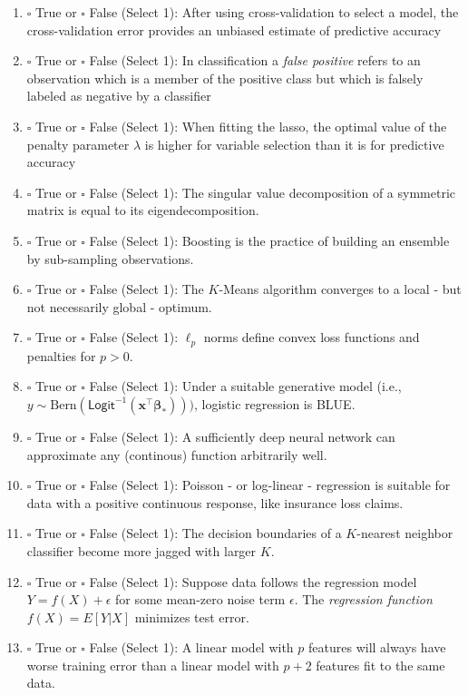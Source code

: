 \documentclass[12pt]{article}
\newcommand{\bx}{\bm{x}}
\newcommand{\bbeta}{\bm{\beta}}
\begin{document}
\begin{enumerate}[label={\bf MC\arabic*.)}]
\item $\square$ True or $\square$ False (Select 1): After using cross-validation to select a model, the cross-validation error provides an unbiased estimate of predictive accuracy
\item $\square$ True or $\square$ False (Select 1): In classification a \emph{false positive} refers to an observation which is a member of the positive class but which is falsely labeled as negative by a classifier
\item $\square$ True or $\square$ False (Select 1): When fitting the lasso, the optimal value of the penalty parameter $\lambda$ is higher for variable selection than it is for predictive accuracy
\item $\square$ True or $\square$ False (Select 1): The singular value decomposition of a symmetric matrix is equal to its eigendecomposition.
\item $\square$ True or $\square$ False (Select 1): Boosting is the practice of building an ensemble by sub-sampling observations. 
\item $\square$ True or $\square$ False (Select 1): The $K$-Means algorithm converges to a local - but not necessarily global - optimum. 
\item $\square$ True or $\square$ False (Select 1): $\ell_p$ norms define convex loss functions and penalties for $p > 0$.
\item $\square$ True or $\square$ False (Select 1): Under a suitable generative model (i.e., $y \sim \text{Bern}(\textsf{Logit}^{-1}(\bx^{\top}\bbeta_*)))$, logistic regression is BLUE. 
\item $\square$ True or $\square$ False (Select 1): A sufficiently deep neural network can approximate any (continous) function arbitrarily well.
\item $\square$ True or $\square$ False (Select 1): Poisson - or log-linear - regression is suitable for data with a positive continuous response, like insurance loss claims.
\item $\square$ True or $\square$ False (Select 1): The decision boundaries of a $K$-nearest neighbor classifier become more jagged with larger $K$.
\item $\square$ True or $\square$ False (Select 1): Suppose data follows the regression model $Y = f(X) + \epsilon$ for some mean-zero noise term $\epsilon$. The \emph{regression function} $f(X) = E[Y | X]$ minimizes test error. 
\item $\square$ True or $\square$ False (Select 1): A linear model with $p$ features will always have worse training error than a linear model with $p + 2$ features fit to the same data.

\end{enumerate}
\end{document}
